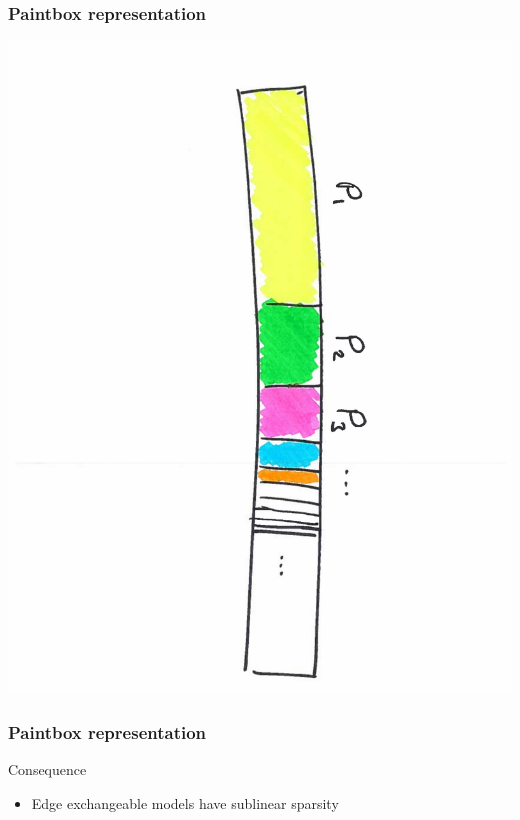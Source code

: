 \documentclass[final,hyperref={pdfpagelabels=false},noamsthm]{beamer}
\begin{document}
\begin{frame}
	\frametitle{Paintbox representation}
	\includegraphics[angle=90,origin=c,scale=0.4]{fig/paintbox}
\end{frame}

\begin{frame}
	\frametitle{Paintbox representation}
	Consequence\begin{itemize}
		\item Edge exchangeable models have sublinear sparsity
	\end{itemize}
\end{frame}
\end{document}
